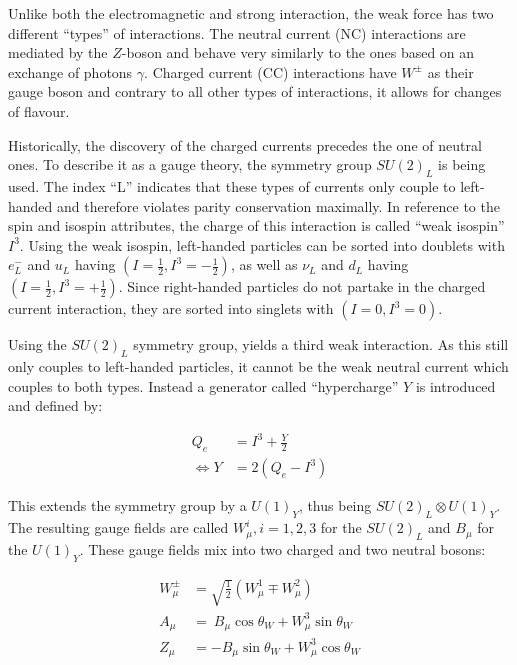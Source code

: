 Unlike both the electromagnetic and strong interaction, the weak force has two different ``types'' of interactions. The neutral current (NC) interactions are mediated by the $Z$-boson and behave very similarly to the ones based on an exchange of photons $\gamma$. Charged current (CC) interactions have $W^\pm$ as their gauge boson and contrary to all other types of interactions, it allows for changes of flavour.

Historically, the discovery of the charged currents precedes the one of neutral ones. To describe it as a gauge theory, the symmetry group $SU(2)_L$ is being used. The index ``L'' indicates that these types of currents only couple to left-handed and therefore violates parity conservation maximally. In reference to the spin and isospin attributes, the charge of this interaction is called ``weak isospin'' $I^3$. Using the weak isospin, left-handed particles can be sorted into doublets with $e^-_L$ and $u_L$ having $(I = \frac{1}{2}, I^3 = -\frac{1}{2})$, as well as $\nu_L$ and $d_L$ having $(I = \frac{1}{2}, I^3 = +\frac{1}{2})$. Since right-handed particles do not partake in the charged current interaction, they are sorted into singlets with $(I = 0, I^3 = 0)$.


Using the $SU(2)_L$ symmetry group, yields a third weak interaction. As this still only couples to left-handed particles, it cannot be the weak neutral current which couples to both types. Instead a generator called ``hypercharge'' $Y$ is introduced and defined by:

\begin{align}
  \label{eq:hypercharge}
                  Q_e &= I^3 + \frac{Y}{2} \\
  \Leftrightarrow Y   &= 2 \left( Q_e - I^3 \right)
\end{align}

\noindent This extends the symmetry group by a $U(1)_Y$, thus being $SU(2)_L \otimes U(1)_Y$. The resulting gauge fields are called $W^i_\mu, i = 1,2,3$ for the $SU(2)_L$ and $B_\mu$ for the $U(1)_Y$. These gauge fields mix into two charged and two neutral bosons:

\begin{align}
  \label{eq:ewbosons}
  W^\pm_\mu & = \sqrt{\frac{1}{2}} \left( W^1_\mu \mp W^2_\mu \right) \\
  A_\mu & = \ B_\mu \cos{\theta_W} + W^3_\mu \sin{\theta_W} \\
  Z_\mu & = - B_\mu \sin{\theta_W} + W^3_\mu \cos{\theta_W}
\end{align}
 
